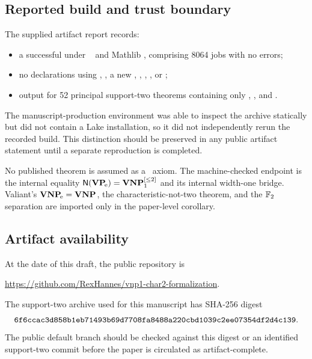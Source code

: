 \subsection{Reported build and trust boundary}

The supplied artifact report records:
\begin{itemize}[leftmargin=1.6em]
\item a successful  under \lean\  and Mathlib
, comprising 8064 jobs with no errors;
\item no declarations using , , a new ,
, , , or ;
\item {} output for 52 principal support-two theorems containing only
, , and .
\end{itemize}
The manuscript-production environment was able to inspect the archive statically but did
not contain a Lake installation, so it did not independently rerun the recorded build.
This distinction should be preserved in any public artifact statement until a separate
reproduction is completed.

No published theorem is assumed as a \lean\ axiom.  The machine-checked endpoint is the
internal equality \(\mathsf{N}(\mathbf{VP}_{\!\mathrm e})=\mathbf{VNP}_{1}^{[\le 2]}\) and its internal width-one bridge.  Valiant's
\(\mathbf{VNP}_{\!\mathrm e}=\mathbf{VNP}\), the characteristic-not-two theorem, and the \(\mathbb{F}_2\) separation are
imported only in the paper-level corollary.

\subsection{Artifact availability}

At the date of this draft, the public repository is
\begin{center}
\url{https://github.com/RexHannes/vnp1-char2-formalization}.
\end{center}
The support-two archive used for this manuscript has SHA-256 digest
\[
\code{6f6ccac3d858b1eb71493b69d7708fa8488a220cbd1039c2ee07354df2d4c139}.
\]
The public default branch should be checked against this digest or an identified support-two
commit before the paper is circulated as artifact-complete.

